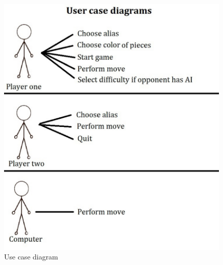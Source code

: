 \documentclass{article}
\begin{document}
\begin{figure}[h]
		\includegraphics*[scale=0.8]{User_case_diagram_2}
	\caption{Use case diagram }
	
\end{figure}
\end{document}
